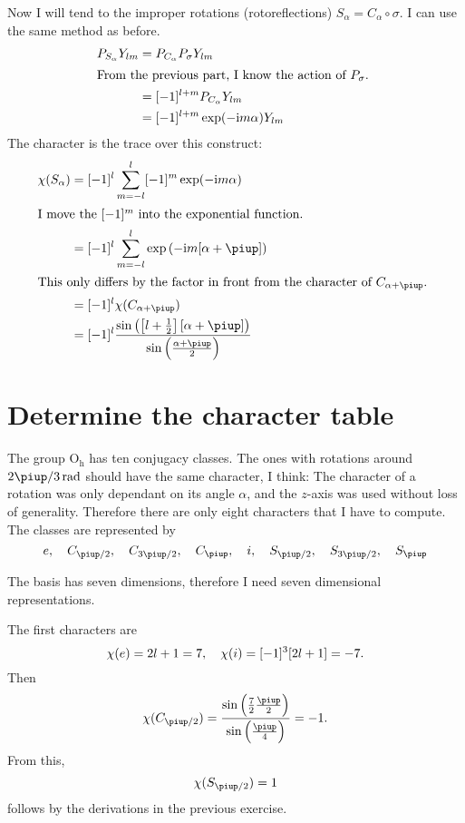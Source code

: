 \documentclass[11pt, english, fleqn, DIV=15, headinclude, BCOR=1cm]{scrartcl}
\begin{document}
Now I will tend to the improper rotations (rotoreflections) $S_\alpha =
C_\alpha \circ \sigma$. I can use the same method as before.
\begin{align*}
    P_{S_\alpha} Y_{lm}
    &= P_{C_\alpha} P_\sigma Y_{lm} \\
    \intertext{%
        From the previous part, I know the action of $P_\sigma$.
    }
    &= [-1]^{l+m} P_{C_\alpha} Y_{lm} \\
    &= [-1]^{l+m} \exp(-\iup m \alpha) Y_{lm}
\end{align*}
The character is the trace over this construct:
\begin{align*}
    \chi(S_\alpha)
    &= [-1]^l \sum_{m=-l}^l [-1]^m \exp(-\iup m \alpha) \\
    \intertext{%
        I move the $[-1]^m$ into the exponential function.
    }
    &= [-1]^l \sum_{m=-l}^l \exp\del{-\iup m [\alpha+\piup]} \\
    \intertext{%
        This only differs by the factor in front from the character of
        $C_{\alpha+\piup}$.
    }
    &= [-1]^l \chi(C_{\alpha+\piup}) \\
    &= [-1]^l \frac{\sin\del{\sbr{l + \frac12}[\alpha +
    \piup]}}{\sin\del{\frac{\alpha+\piup}2}} \\
\end{align*}

\section{Determine the character table}

The group $\mathrm{O_h}$ has ten conjugacy classes. The ones with rotations
around ${2\piup/3}\,\si{\radian}$ should have the same character, I think: The
character of a rotation was only dependant on its angle $\alpha$, and the
$z$-axis was used without loss of generality. Therefore there are only eight
characters that I have to compute. The classes are represented by
\[
    e
    \eqnsep
    C_{\piup/2}
    \eqnsep
    C_{3\piup/2}
    \eqnsep
    C_{\piup}
    \eqnsep
    i
    \eqnsep
    S_{\piup/2}
    \eqnsep
    S_{3\piup/2}
    \eqnsep
    S_{\piup}
\]

The basis has seven dimensions, therefore I need seven dimensional
representations.

The first characters are
\[
    \chi(e) = 2l+1 = 7
    ,\quad
    \chi(i) = [-1]^3 [2l+1] = - 7.
\]
Then
\[
    \chi(C_{\piup/2})
    = \frac{\sin\del{\frac72 \frac\piup2}}{\sin\del{\frac\piup4}}
    = - 1.
\]
From this,
\[
    \chi(S_{\piup/2})
    = 1
\]
follows by the derivations in the previous exercise.
\end{document}

